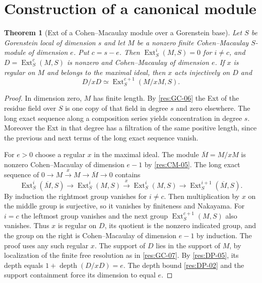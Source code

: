 \documentclass[11pt,oneside,openany]{book}
\newtheorem{theorem}{Theorem}[chapter]
\theoremstyle{definition}
\theoremstyle{remark}
\begin{document}
\section{Construction of a canonical module}

\begin{theorem}[Ext of a Cohen--Macaulay module over a Gorenstein base]
\label{res:GC-09}
Let $S$ be Gorenstein local of dimension $s$ and let $M$ be
a nonzero finite Cohen--Macaulay $S$-module of dimension $e$.
Put $c=s-e$. Then $\operatorname{Ext}_S^i(M,S)=0$ for $i\ne c$,
and $D=\operatorname{Ext}_S^c(M,S)$ is nonzero and
Cohen--Macaulay of dimension $e$. If $x$ is regular on $M$
and belongs to the maximal ideal, then $x$ acts injectively
on $D$ and
\[
 D/xD\simeq\operatorname{Ext}_S^{c+1}(M/xM,S).
\]
\end{theorem}
\begin{proof}
In dimension zero, $M$ has finite length. By \ref{res:GC-06}
the Ext of the residue field over $S$ is one copy of that
field in degree $s$ and zero elsewhere. The long exact
sequence along a composition series yields concentration
in degree $s$. Moreover the Ext in that degree has a
filtration of the same positive length, since the previous
and next terms of the long exact sequence vanish.

For $e>0$ choose a regular $x$ in the maximal ideal. The
module $\overline M=M/xM$ is nonzero Cohen--Macaulay of dimension
$e-1$ by \ref{res:CM-05}. The long exact sequence of
$0\to M\xrightarrow{x}M\to\overline M\to0$ contains
\[
 \operatorname{Ext}^i_S(\overline M,S)\longrightarrow
 \operatorname{Ext}^i_S(M,S)\xrightarrow{x}
 \operatorname{Ext}^i_S(M,S)\longrightarrow
 \operatorname{Ext}^{i+1}_S(\overline M,S).
\]
By induction the rightmost group vanishes for $i\ne c$.
Then multiplication by $x$ on the middle group is surjective,
so it vanishes by finiteness and Nakayama. For $i=c$ the
leftmost group vanishes and the next group
$\operatorname{Ext}^{c+1}_S(M,S)$ also vanishes. Thus $x$
is regular on $D$, its quotient is the nonzero indicated
group, and the group on the right is Cohen--Macaulay of
dimension $e-1$ by induction. The proof uses any such
regular $x$. The support of $D$ lies in the support of
$M$, by localization of the finite free resolution as
in \ref{res:GC-07}. By \ref{res:DP-05}, its depth equals
$1+\operatorname{depth}(D/xD)=e$. The depth bound
\ref{res:DP-02} and the support containment force its
dimension to equal $e$.
\end{proof}
\end{document}
